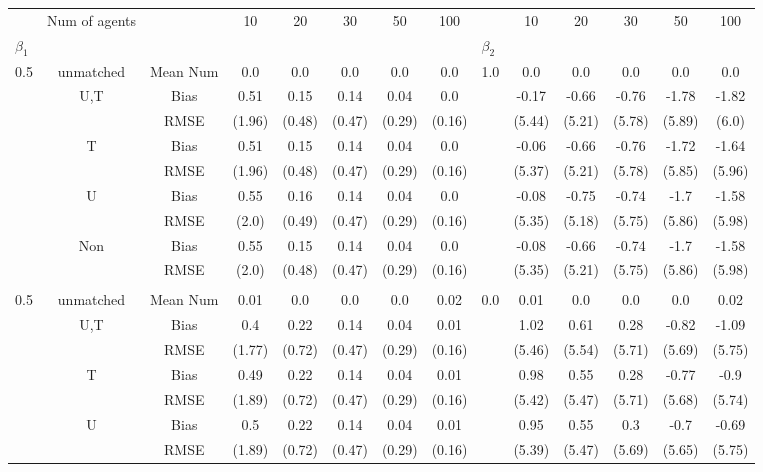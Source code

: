 \begin{tabular}{@{\extracolsep{5pt}}lc|cccccc|lccccc}
\toprule 
 & Num of agents &  & 10 & 20 & 30 & 50 & 100 &  & 10 & 20 & 30 & 50 & 100 \\
$\beta_1$ &  &  &  &  &  &  &  & $\beta_2$ &  &  &  &  &  \\
\midrule 
0.5 & unmatched & Mean Num & 0.0 & 0.0 & 0.0 & 0.0 & 0.0 & 1.0 & 0.0 & 0.0 & 0.0 & 0.0 & 0.0 \\
 & U,T & Bias & 0.51 & 0.15 & 0.14 & 0.04 & 0.0 &  & -0.17 & -0.66 & -0.76 & -1.78 & -1.82 \\
 &  & RMSE & (1.96) & (0.48) & (0.47) & (0.29) & (0.16) &  & (5.44) & (5.21) & (5.78) & (5.89) & (6.0) \\
 & T & Bias & 0.51 & 0.15 & 0.14 & 0.04 & 0.0 &  & -0.06 & -0.66 & -0.76 & -1.72 & -1.64 \\
 &  & RMSE & (1.96) & (0.48) & (0.47) & (0.29) & (0.16) &  & (5.37) & (5.21) & (5.78) & (5.85) & (5.96) \\
 & U & Bias & 0.55 & 0.16 & 0.14 & 0.04 & 0.0 &  & -0.08 & -0.75 & -0.74 & -1.7 & -1.58 \\
 &  & RMSE & (2.0) & (0.49) & (0.47) & (0.29) & (0.16) &  & (5.35) & (5.18) & (5.75) & (5.86) & (5.98) \\
 & Non & Bias & 0.55 & 0.15 & 0.14 & 0.04 & 0.0 &  & -0.08 & -0.66 & -0.74 & -1.7 & -1.58 \\
 &  & RMSE & (2.0) & (0.48) & (0.47) & (0.29) & (0.16) &  & (5.35) & (5.21) & (5.75) & (5.86) & (5.98) \\
 &  &  &  &  &  &  &  &  &  &  &  &  &  \\
0.5 & unmatched & Mean Num & 0.01 & 0.0 & 0.0 & 0.0 & 0.02 & 0.0 & 0.01 & 0.0 & 0.0 & 0.0 & 0.02 \\
 & U,T & Bias & 0.4 & 0.22 & 0.14 & 0.04 & 0.01 &  & 1.02 & 0.61 & 0.28 & -0.82 & -1.09 \\
 &  & RMSE & (1.77) & (0.72) & (0.47) & (0.29) & (0.16) &  & (5.46) & (5.54) & (5.71) & (5.69) & (5.75) \\
 & T & Bias & 0.49 & 0.22 & 0.14 & 0.04 & 0.01 &  & 0.98 & 0.55 & 0.28 & -0.77 & -0.9 \\
 &  & RMSE & (1.89) & (0.72) & (0.47) & (0.29) & (0.16) &  & (5.42) & (5.47) & (5.71) & (5.68) & (5.74) \\
 & U & Bias & 0.5 & 0.22 & 0.14 & 0.04 & 0.01 &  & 0.95 & 0.55 & 0.3 & -0.7 & -0.69 \\
 &  & RMSE & (1.89) & (0.72) & (0.47) & (0.29) & (0.16) &  & (5.39) & (5.47) & (5.69) & (5.65) & (5.75) \\

\end{tabular}
